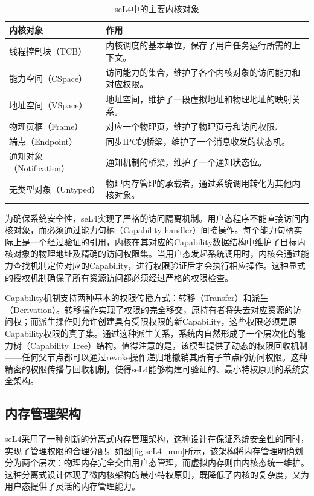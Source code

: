 \begin{table}[htbp]
  \centering
  \begin{tabular*}{1.0\textwidth}{@{\extracolsep{\fill}}ll}
  \toprule
    内核对象			&作用	 \\
  \midrule
    线程控制块（TCB）			&内核调度的基本单位，保存了用户任务运行所需的上下文。 \\
    能力空间（CSpace）			&访问能力的集合，维护了各个内核对象的访问能力和对应权限。	 \\
    地址空间（VSpace） &地址空间，维护了一段虚拟地址和物理地址的映射关系。	 \\
    物理页框（Frame）  &对应一个物理页，维护了物理页号和访问权限.\\
    端点（Endpoint）	&同步IPC的桥梁，维护了一个消息收发的状态机。 \\
    通知对象（Notification） &通知机制的桥梁，维护了一个通知状态位。\\
    无类型对象（Untyped）&物理内存管理的承载者，通过系统调用转化为其他内核对象。 \\
  \bottomrule
  \end{tabular*}
  \caption{seL4中的主要内核对象} \label{tab:kernel_object}
\end{table}

为确保系统安全性，seL4实现了严格的访问隔离机制。用户态程序不能直接访问内核对象，而必须通过能力句柄（Capability handler）间接操作。每个能力句柄实际上是一个经过验证的引用，内核在其对应的Capability数据结构中维护了目标内核对象的物理地址及精确的访问权限集。当用户态发起系统调用时，内核会通过能力查找机制定位对应的Capability，进行权限验证后才会执行相应操作。这种显式的授权机制确保了所有资源访问都必须经过严格的权限检查。

Capability机制支持两种基本的权限传播方式：转移（Transfer）和派生（Derivation）。转移操作实现了权限的完全移交，原持有者将失去对应资源的访问权；而派生操作则允许创建具有受限权限的新Capability，这些权限必须是原Capability权限的真子集。通过这种派生关系，系统内自然形成了一个层次化的能力树（Capability Tree）结构。值得注意的是，该模型提供了动态的权限回收机制——任何父节点都可以通过revoke操作递归地撤销其所有子节点的访问权限。这种精密的权限传播与回收机制，使得seL4能够构建可验证的、最小特权原则的系统安全架构。

\subsection{内存管理架构}

seL4采用了一种创新的分离式内存管理架构，这种设计在保证系统安全性的同时，实现了管理权限的合理分配。如图\ref{fig:seL4_mm}所示，该架构将内存管理明确划分为两个层次：物理内存完全交由用户态管理，而虚拟内存则由内核态统一维护。这种分离式设计体现了微内核架构的最小特权原则，既降低了内核的复杂度，又为用户态提供了灵活的内存管理能力。

